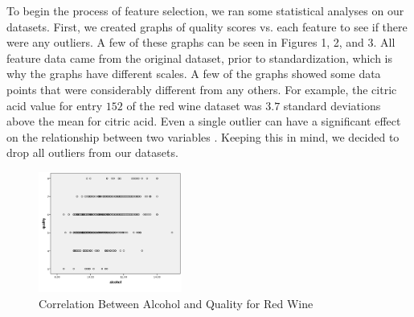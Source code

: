 To begin the process of feature selection, we ran some statistical analyses on our datasets. First, we created graphs of quality scores vs. each feature to see if there were any outliers. A few of these graphs can be seen in Figures 1, 2, and 3. All feature data came from the original dataset, prior to standardization, which is why the graphs have different scales. A few of the graphs showed some data points that were considerably different from any others. For example, the citric acid value for entry $152$ of the red wine dataset was $3.7$ standard deviations above the mean for citric acid. Even a single outlier can have a significant effect on the relationship between two variables \cite{aia}. Keeping this in mind, we decided to drop all outliers from our datasets.\\
\begin{figure}[htb]

  \centering  %

  \includegraphics[width=0.42\textwidth]{1.png}

  \caption{Correlation Between Alcohol and Quality for Red Wine}

  \label{fig:tex}

  \end{figure}
  
